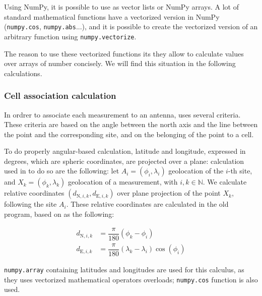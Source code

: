 \documentclass[a4paper, 11pt]{report}
\begin{document}
    Using NumPy, it is possible to use as vector lists or NumPy arrays. A lot of standard mathematical functions have a vectorized version in NumPy (\texttt{numpy.cos}, \texttt{numpy.abs}...), and it is possible to create the vectorized version of an arbitrary function using \texttt{numpy.vectorize}. \newline
    
    The reason to use these vectorized functions its they allow to calculate values over arrays of number concisely. We will find this situation in the following calculations.
    
    \subsubsection{Cell association calculation}
    
    In ordrer to associate each measurement to an antenna, \cite{trieu_visualization_2019}
    uses several criteria. These criteria are based on the angle between the north axis and the line between the point and the corresponding site, and on the belonging of the point to a cell. \newline
    
    To do properly angular-based calculation, latitude and longitude, expressed in degrees, which are spheric coordinates, are projected over a plane: calculation used in \cite{trieu_visualization_2019}
    to do so are the following: let $A_i = \left(\phi_i, \lambda_i\right)$ geolocation of the $i$-th site, and $X_k = \left(\phi_k, \lambda_k\right)$ geolocation of a measurement, with $i, k \in \mathbb{N}$. We calculate relative coordinates $\left(d_{\text{N}, i, k}, d_{\text{E}, i, k}\right)$ over plane projection of the point $X_k$, following the site $A_i$. These relative coordinates are calculated in the old program, based on \cite{trieu_visualization_2019}
    as the following:
    
    \begin{align}
        d_{\text{N}, i, k} & = \dfrac{\pi}{180}\left(\phi_k - \phi_i\right) \\
        d_{\text{E}, i, k} & = \dfrac{\pi}{180}\left(\lambda_k - \lambda_i\right) \cos(\phi_i)
    \end{align}
    
    \texttt{numpy.array} containing latitudes and longitudes are used for this calculus, as they uses vectorized mathematical operators overloads; \texttt{numpy.cos} function is also used. \newline
    
\end{document}
